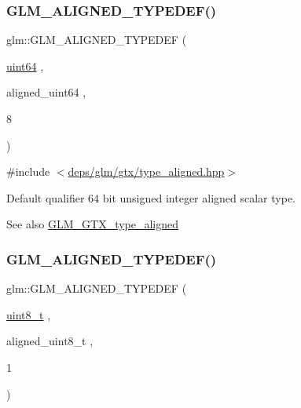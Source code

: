 \subsubsection{\texorpdfstring{G\+L\+M\+\_\+\+A\+L\+I\+G\+N\+E\+D\+\_\+\+T\+Y\+P\+E\+D\+E\+F()}{GLM\_ALIGNED\_TYPEDEF()}\hspace{0.1cm}{\footnotesize\ttfamily [108/209]}}
{\footnotesize\ttfamily glm\+::\+G\+L\+M\+\_\+\+A\+L\+I\+G\+N\+E\+D\+\_\+\+T\+Y\+P\+E\+D\+EF (\begin{DoxyParamCaption}\item[{\hyperlink{group__gtc__type__precision_gae3632bf9b37da66233d78930dd06378a}{uint64}}]{,  }\item[{aligned\+\_\+uint64}]{,  }\item[{8}]{ }\end{DoxyParamCaption})}



{\ttfamily \#include $<$\hyperlink{gtx_2type__aligned_8hpp}{deps/glm/gtx/type\+\_\+aligned.\+hpp}$>$}

Default qualifier 64 bit unsigned integer aligned scalar type. \begin{DoxySeeAlso}{See also}
\hyperlink{group__gtx__type__aligned}{G\+L\+M\+\_\+\+G\+T\+X\+\_\+type\+\_\+aligned} 
\end{DoxySeeAlso}
\mbox{\label{group__gtx__type__aligned_gaf6ced36f13bae57f377bafa6f5fcc299}} 
\subsubsection{\texorpdfstring{G\+L\+M\+\_\+\+A\+L\+I\+G\+N\+E\+D\+\_\+\+T\+Y\+P\+E\+D\+E\+F()}{GLM\_ALIGNED\_TYPEDEF()}\hspace{0.1cm}{\footnotesize\ttfamily [109/209]}}
{\footnotesize\ttfamily glm\+::\+G\+L\+M\+\_\+\+A\+L\+I\+G\+N\+E\+D\+\_\+\+T\+Y\+P\+E\+D\+EF (\begin{DoxyParamCaption}\item[{\hyperlink{group__gtc__type__precision_ga93adf6dd9803408f3e3aaf9dedda352b}{uint8\+\_\+t}}]{,  }\item[{aligned\+\_\+uint8\+\_\+t}]{,  }\item[{1}]{ }\end{DoxyParamCaption})}



